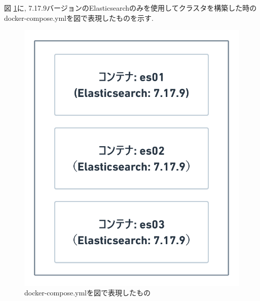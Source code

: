 図 \ref{4-p3}に, 7.17.9バージョンのElasticsearchのみを使用してクラスタを構築した時のdocker-compose.ymlを図で表現したものを示す.

\begin{figure}[H]
  \begin{center}
    \includegraphics[width=120mm]{sotu/figure/all-7.19.9.png}
    \caption{docker-compose.ymlを図で表現したもの}
    \label{4-p3}
  \end{center}
\end{figure}



